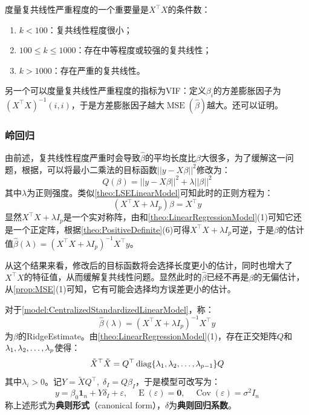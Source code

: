 \begin{note}
	度量复共线性严重程度的一个重要量是$X^{\top}X$的条件数：
	\begin{enumerate}
		\item $k<100$：复共线性程度很小；
		\item $100\leqslant k\leqslant1000$：存在中等程度或较强的复共线性；
		\item $k>1000$：存在严重的复共线性。
	\end{enumerate}
	另一个可以度量复共线性严重程度的指标为\gls{VIF}：定义$\beta_i$的方差膨胀因子为$(X^{\top}X)^{-1}(i,i)$，于是方差膨胀因子越大$\operatorname{MSE}(\hat{\beta})$越大。还可以证明。
\end{note}
\subsubsection{岭回归}
\begin{note}
	由前述，复共线性程度严重时会导致$\hat{\beta}$的平均长度比$\beta$大很多，为了缓解这一问题，根据，可以将最小二乘法的目标函数$||y-X\beta||^2$修改为：
	\begin{equation*}
		Q(\beta)=||y-X\beta||^2+\lambda||\beta||^2
	\end{equation*}
	其中$\lambda$为正则强度。类似\cref{theo:LSELinearModel}可知此时的正则方程为：
	\begin{equation*}
		(X^{\top}X+\lambda I_{p})\beta=X^{\top}y
	\end{equation*}
	显然$X^{\top}X+\lambda I_{p}$是一个实对称阵，由和\cref{theo:LinearRegressionModel}(1)可知它还是一个正定阵，根据\cref{theo:PositiveDefinite}(6)可得$X^{\top}X+\lambda I_{p}$可逆，于是$\beta$的估计值$\hat{\beta}(\lambda)=(X^{\top}X+\lambda I_{p})^{-1}X^{\top}y$。\par
	从这个结果来看，修改后的目标函数将会选择长度更小的估计，同时也增大了$X^{\top}X$的特征值，从而缓解复共线性问题。显然此时的$\hat{\beta}$已经不再是$\beta$的无偏估计，从\cref{prop:MSE}(1)可知，它有可能会选择均方误差更小的估计。
\end{note}
\begin{definition}
	对于\cref{model:CentralizedStandardizedLinearModel}，称：
	\begin{equation*}
		\hat{\beta}(\lambda)=(X^{\top}X+\lambda I_p)^{-1}X^{\top}y
	\end{equation*}
	为$\beta$的\gls{RidgeEstimate}。由\cref{theo:LinearRegressionModel}(1)，存在正交矩阵$Q$和$\lambda_1, \lambda_2, \dots, \lambda_{p}$使得：
	\begin{equation*}
		\tilde{X}^{\top}\tilde{X}=Q^{\top}\operatorname{diag}\{\lambda_1, \lambda_2, \dots, \lambda_{p-1}\}Q
	\end{equation*}
	其中$\lambda_i>0$。记$Y=\tilde{X}Q^{\top},\;\delta_I=Q\beta_I$，于是模型可改写为：
	\begin{equation*}
		y=\beta_0\mathbf{1}_n+Y\delta_I+\varepsilon,\quad\operatorname{E}(\varepsilon)=\mathbf{0},\quad\operatorname{Cov}(\varepsilon)=\sigma^2I_n
	\end{equation*}
	称上述形式为\textbf{典则形式}（canonical form），$\delta$为\textbf{典则回归系数}。
\end{definition}
